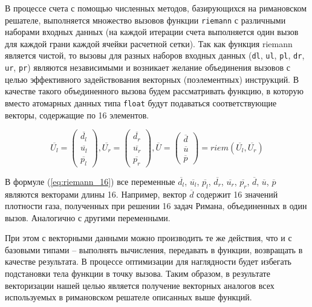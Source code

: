 \documentclass[utf8]{psta}
\begin{document}
В процессе счета с помощью численных методов, базирующихся на римановском решателе, выполняется множество вызовов функции \texttt{riemann} с различными наборами входных данных (на каждой итерации счета выполняется один вызов для каждой грани каждой ячейки расчетной сетки).
Так как функция riemann является чистой, то вызовы для разных наборов входных данных (\texttt{dl}, \texttt{ul}, \texttt{pl}, \texttt{dr}, \texttt{ur}, \texttt{pr}) являются независимыми и возникает желание объединения вызовов с целью эффективного задействования векторных (поэлементных) инструкций.
В качестве такого объединенного вызова будем рассматривать функцию, в которую вместо атомарных данных типа \texttt{float} будут подаваться соответствующие векторы, содержащие по 16 элементов.

\begin{equation}\label{eq:riemann_16}
\overline{U_l} = \left( \begin{array}{ccc} \overline{d_l} \\ \overline{u_l} \\ \overline{p_l} \end{array} \right),
\overline{U_r} = \left( \begin{array}{ccc} \overline{d_r} \\ \overline{u_r} \\ \overline{p_r} \end{array} \right),
\overline{U} = \left( \begin{array}{ccc} \overline{d} \\ \overline{u} \\ \overline{p} \end{array} \right) = riem(\overline{U_l}, \overline{U_r})
\end{equation}

В формуле (\ref{eq:riemann_16}) все переменные $\overline{d_l}$, $\overline{u_l}$, $\overline{p_l}$, $\overline{d_r}$, $\overline{u_r}$, $\overline{p_r}$, $\overline{d}$, $\overline{u}$, $\overline{p}$ являются векторами длины 16.
Например, вектор $\overline{d}$ содержит 16 значений плотности газа, полученных при решении 16 задач Римана, объединенных в один вызов.
Аналогично с другими переменными.

При этом с векторными данными можно производить те же действия, что и с базовыми типами -- выполнять вычисления, передавать в функции, возвращать в качестве результата.
В процессе оптимизации для наглядности будет избегать подстановки тела функции в точку вызова.
Таким образом, в результате векторизации нашей целью является получение векторных аналогов всех используемых в римановском решателе описанных выше функций.
\end{document}

